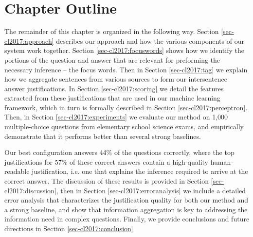\section{Chapter Outline}

The remainder of this chapter is organized in the following way.  Section \ref{sec-cl2017:approach} describes our approach and how the various components of our system work together.  Section \ref{sec-cl2017:focuswords} shows how we identify the portions of the question and answer that are relevant for preforming the necessary inference -- the focus words.  Then in Section \ref{sec-cl2017:tag} we explain how we aggregate sentences from various sources to form our intersentence answer justifications.  In Section \ref{sec-cl2017:scoring} we detail the features extracted from these justifications that are used in our machine learning framework, which in turn is formally described in Section \ref{sec-cl2017:perceptron}.  
Then, in Section \ref{sec-cl2017:experiments} we evaluate our method on 1,000 multiple-choice questions from elementary school science exams, and empirically demonstrate that it performs better than several strong baselines.%

Our best configuration answers 44\% of the questions correctly, where the top justifications for 57\% of these correct answers contain a high-quality human-readable justification, i.e. one that explains the inference required to arrive at the correct answer.  
The discussion of these results is provided in Section \ref{sec-cl2017:discussion}, then in Section \ref{sec-cl2017:erroranalysis}
we include a detailed error analysis that characterizes the justification quality for both our method and a strong baseline, and show that information aggregation is key to addressing the information need in complex questions.  Finally, we provide conclusions and future directions in Section \ref{sec-cl2017:conclusion}


